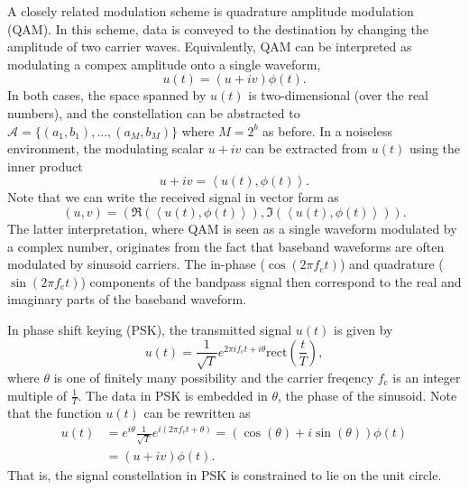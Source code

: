 A closely related modulation scheme is quadrature amplitude modulation (QAM).
In this scheme, data is conveyed to the destination by changing the amplitude of two carrier waves.
Equivalently, QAM can be interpreted as modulating a compex amplitude onto a single waveform,
\begin{equation*}
u(t) = (u + iv) \phi(t) .
\end{equation*}
In both cases, the space spanned by $u(t)$ is two-dimensional (over the real numbers), and the constellation can be abstracted to $\mathcal{A} = \{ (a_1, b_1), \ldots, (a_M, b_M) \}$ where $M = 2^b$ as before.
In a noiseless environment, the modulating scalar $u + iv$ can be extracted from $u(t)$ using the inner product
\begin{equation*}
u + i v = \left\langle u(t), \phi(t) \right\rangle .
\end{equation*}
Note that we can write the received signal in vector form as
\begin{equation*}
(u, v) = \left( \Re \left( \left\langle u(t), \phi(t) \right\rangle \right),
\Im \left( \left\langle u(t), \phi(t) \right\rangle \right) \right) .
\end{equation*}
The latter interpretation, where QAM is seen as a single waveform modulated by a complex number, originates from the fact that baseband waveforms are often modulated by sinusoid carriers.
The in-phase ($\cos (2 \pi f_{\mathrm{c}} t)$) and quadrature ($\sin (2 \pi f_{\mathrm{c}} t)$) components of the bandpass signal then correspond to the real and imaginary parts of the baseband waveform.

\begin{example}
In phase shift keying (PSK), the transmitted signal $u(t)$ is given by
\begin{equation*}
u(t) = \frac{1}{\sqrt{T}} e^{2 \pi i f_{\mathrm{c}} t + i \theta}
\mathrm{rect} \left( \frac{t}{T} \right) ,
\end{equation*}
where $\theta$ is one of finitely many possibility and the carrier freqency $f_{\mathrm{c}}$ is an integer multiple of $\frac{1}{T}$.
The data in PSK is embedded in $\theta$, the phase of the sinusoid.
Note that the function $u(t)$ can be rewritten as
\begin{equation*}
\begin{split}
u(t) &= e^{i \theta} \frac{1}{\sqrt{T}} e^{i (2 \pi f_{\mathrm{c}} t + \theta)}
= \left( \cos (\theta) + i \sin (\theta) \right) \phi (t) \\
&= (u + iv) \phi (t) .
\end{split}
\end{equation*}
That is, the signal constellation in PSK is constrained to lie on the unit circle.
\end{example}



